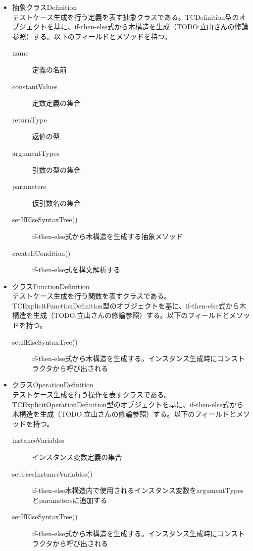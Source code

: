 \documentclass[uplatex, report, a4j, 10pt]{jsbook}
\begin{document}
\begin{itemize}
  \item 抽象クラスDefinition\\
        テストケース生成を行う定義を表す抽象クラスである。TCDefinition型のオブジェクトを基に、if-then-else式から木構造を生成（TODO:立山さんの修論参照）する。以下のフィールドとメソッドを持つ。
        \begin{description}
          \item[name] 定義の名前
          \item[constantValues] 定数定義の集合
          \item[returnType] 返値の型
          \item[argumentTypes] 引数の型の集合
          \item[parameters] 仮引数名の集合
          \item[setIfElseSyntaxTree()] if-then-else式から木構造を生成する抽象メソッド
          \item[createIfCondition()] if-then-else式を構文解析する
        \end{description}

  \item クラスFunctionDefinition\\
        テストケース生成を行う関数を表すクラスである。TCExplicitFunctionDefinition型のオブジェクトを基に、if-then-else式から木構造を生成（TODO:立山さんの修論参照）する。以下のフィールドとメソッドを持つ。
        \begin{description}
          \item[setIfElseSyntaxTree()] if-then-else式から木構造を生成する。インスタンス生成時にコンストラクタから呼び出される
        \end{description}

  \item クラスOperationDefinition\\
        テストケース生成を行う操作を表すクラスである。TCExplicitOperationDefinition型のオブジェクトを基に、if-then-else式から木構造を生成（TODO:立山さんの修論参照）する。以下のフィールドとメソッドを持つ。
        \begin{description}
          \item[instanceVariables] インスタンス変数定義の集合
          \item[setUsesInstanceVariables()] if-then-else木構造内で使用されるインスタンス変数をargumentTypesとparametersに追加する
          \item[setIfElseSyntaxTree()] if-then-else式から木構造を生成する。インスタンス生成時にコンストラクタから呼び出される
        \end{description}


\end{itemize}
\end{document}
